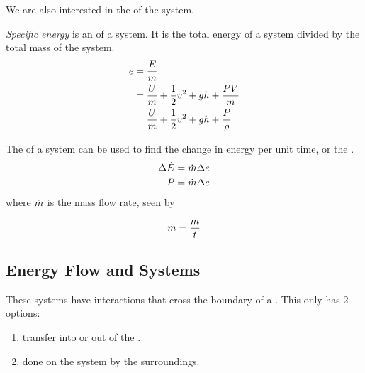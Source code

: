 We are also interested in the  of the system.
\begin{definition}\label{def:Specific_Energy}
  \emph{Specific energy} is an  of a system.
  It is the total energy of a system divided by the total mass of the system.
  \begin{equation}\label{eq:Specific_Energy}
    \begin{aligned}
      e &= \frac{E}{m} \\
      &= \frac{U}{m} + \frac{1}{2} v^{2} + g h + \frac{P V}{m} \\
      &= \frac{U}{m} + \frac{1}{2} v^{2} + g h + \frac{P}{\rho} \\
    \end{aligned}
  \end{equation}
\end{definition}

The  of a system can be used to find the change in energy per unit time, or the .
\begin{equation}\label{eq:Energy_Flow_Rate}
  \begin{aligned}
    \Delta \dot{E} &= \dot{m} \Delta e \\
    P &= \dot{m} \Delta e \\
  \end{aligned}
\end{equation}
where $\dot{m}$ is the mass flow rate, seen by 

\begin{equation}\label{eq:Mass_Flow_Rate}
  \dot{m} = \frac{m}{t}
\end{equation}

\subsection{Energy Flow and Systems}\label{subsec:Energy_Flow_Systems}
These systems have  interactions that cross the boundary of a .
This only has 2 options:
\begin{enumerate}[noitemsep]
\item {} transfer into or out of the .
\item {} done on the system by the surroundings.
\end{enumerate}


